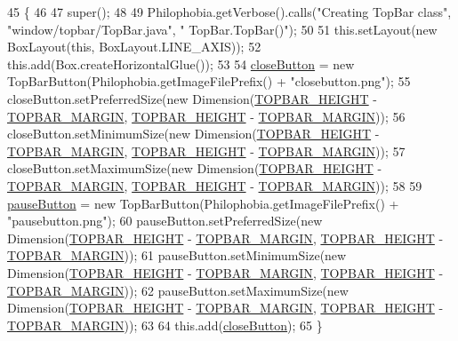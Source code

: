 \begin{DoxyCode}
45                     \{
46 
47         super();
48 
49         Philophobia.getVerbose().calls(\textcolor{stringliteral}{"Creating TopBar class"}, \textcolor{stringliteral}{"window/topbar/TopBar.java"}, \textcolor{stringliteral}{"
      TopBar.TopBar()"});
50 
51         this.setLayout(\textcolor{keyword}{new} BoxLayout(\textcolor{keyword}{this}, BoxLayout.LINE\_AXIS));
52         this.add(Box.createHorizontalGlue());
53 
54         \hyperlink{a00031_a98271c11b9bbb79d1e79e03752d4e0b4}{closeButton} = \textcolor{keyword}{new} TopBarButton(Philophobia.getImageFilePrefix() + \textcolor{stringliteral}{"closebutton.png"});
55         closeButton.setPreferredSize(\textcolor{keyword}{new} Dimension(\hyperlink{a00031_aa7100cb3da5276c12e4fae659823bf4e}{TOPBAR\_HEIGHT} - 
      \hyperlink{a00031_a8d48486507d36a825223a21b1b6333ac}{TOPBAR\_MARGIN}, \hyperlink{a00031_aa7100cb3da5276c12e4fae659823bf4e}{TOPBAR\_HEIGHT} - \hyperlink{a00031_a8d48486507d36a825223a21b1b6333ac}{TOPBAR\_MARGIN}));
56         closeButton.setMinimumSize(\textcolor{keyword}{new} Dimension(\hyperlink{a00031_aa7100cb3da5276c12e4fae659823bf4e}{TOPBAR\_HEIGHT} - 
      \hyperlink{a00031_a8d48486507d36a825223a21b1b6333ac}{TOPBAR\_MARGIN}, \hyperlink{a00031_aa7100cb3da5276c12e4fae659823bf4e}{TOPBAR\_HEIGHT} - \hyperlink{a00031_a8d48486507d36a825223a21b1b6333ac}{TOPBAR\_MARGIN}));
57         closeButton.setMaximumSize(\textcolor{keyword}{new} Dimension(\hyperlink{a00031_aa7100cb3da5276c12e4fae659823bf4e}{TOPBAR\_HEIGHT} - 
      \hyperlink{a00031_a8d48486507d36a825223a21b1b6333ac}{TOPBAR\_MARGIN}, \hyperlink{a00031_aa7100cb3da5276c12e4fae659823bf4e}{TOPBAR\_HEIGHT} - \hyperlink{a00031_a8d48486507d36a825223a21b1b6333ac}{TOPBAR\_MARGIN}));
58 
59         \hyperlink{a00031_ac7b4f88657cb97d1ae3df6a99d3694e9}{pauseButton} = \textcolor{keyword}{new} TopBarButton(Philophobia.getImageFilePrefix() + \textcolor{stringliteral}{"pausebutton.png"});
60         pauseButton.setPreferredSize(\textcolor{keyword}{new} Dimension(\hyperlink{a00031_aa7100cb3da5276c12e4fae659823bf4e}{TOPBAR\_HEIGHT} - 
      \hyperlink{a00031_a8d48486507d36a825223a21b1b6333ac}{TOPBAR\_MARGIN}, \hyperlink{a00031_aa7100cb3da5276c12e4fae659823bf4e}{TOPBAR\_HEIGHT} - \hyperlink{a00031_a8d48486507d36a825223a21b1b6333ac}{TOPBAR\_MARGIN}));
61         pauseButton.setMinimumSize(\textcolor{keyword}{new} Dimension(\hyperlink{a00031_aa7100cb3da5276c12e4fae659823bf4e}{TOPBAR\_HEIGHT} - 
      \hyperlink{a00031_a8d48486507d36a825223a21b1b6333ac}{TOPBAR\_MARGIN}, \hyperlink{a00031_aa7100cb3da5276c12e4fae659823bf4e}{TOPBAR\_HEIGHT} - \hyperlink{a00031_a8d48486507d36a825223a21b1b6333ac}{TOPBAR\_MARGIN}));
62         pauseButton.setMaximumSize(\textcolor{keyword}{new} Dimension(\hyperlink{a00031_aa7100cb3da5276c12e4fae659823bf4e}{TOPBAR\_HEIGHT} - 
      \hyperlink{a00031_a8d48486507d36a825223a21b1b6333ac}{TOPBAR\_MARGIN}, \hyperlink{a00031_aa7100cb3da5276c12e4fae659823bf4e}{TOPBAR\_HEIGHT} - \hyperlink{a00031_a8d48486507d36a825223a21b1b6333ac}{TOPBAR\_MARGIN}));
63 
64         this.add(\hyperlink{a00031_a98271c11b9bbb79d1e79e03752d4e0b4}{closeButton});
65     \}
\end{DoxyCode}


